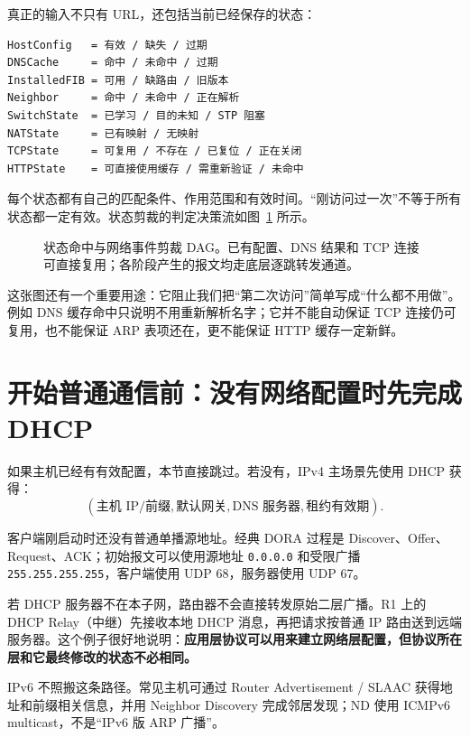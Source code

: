 \documentclass[UTF8,fontset=none,11pt,a4paper]{ctexart}
\begin{document}
真正的输入不只有 URL，还包括当前已经保存的状态：

\begin{verbatim}
HostConfig   = 有效 / 缺失 / 过期
DNSCache     = 命中 / 未命中 / 过期
InstalledFIB = 可用 / 缺路由 / 旧版本
Neighbor     = 命中 / 未命中 / 正在解析
SwitchState  = 已学习 / 目的未知 / STP 阻塞
NATState     = 已有映射 / 无映射
TCPState     = 可复用 / 不存在 / 已复位 / 正在关闭
HTTPState    = 可直接使用缓存 / 需重新验证 / 未命中
\end{verbatim}

每个状态都有自己的匹配条件、作用范围和有效时间。“刚访问过一次”不等于所有状态都一定有效。状态剪裁的判定决策流如图~\ref{fig:state-reuse} 所示。

\begin{figure}[!htbp]
  \centering
  \resizebox{0.84\linewidth}{!}{}
  \caption{状态命中与网络事件剪裁 DAG。已有配置、DNS 结果和 TCP 连接可直接复用；各阶段产生的报文均走底层逐跳转发通道。}
  \label{fig:state-reuse}
\end{figure}

这张图还有一个重要用途：它阻止我们把“第二次访问”简单写成“什么都不用做”。例如 DNS 缓存命中只说明不用重新解析名字；它并不能自动保证 TCP 连接仍可复用，也不能保证 ARP 表项还在，更不能保证 HTTP 缓存一定新鲜。

\section{开始普通通信前：没有网络配置时先完成 DHCP}

如果主机已经有有效配置，本节直接跳过。若没有，IPv4 主场景先使用 DHCP 获得：
\[
(\text{主机 IP/前缀},\text{默认网关},\text{DNS 服务器},\text{租约有效期}).
\]

客户端刚启动时还没有普通单播源地址。经典 DORA 过程是 Discover、Offer、Request、ACK；初始报文可以使用源地址 \texttt{0.0.0.0} 和受限广播 \texttt{255.255.255.255}，客户端使用 UDP 68，服务器使用 UDP 67。

若 DHCP 服务器不在本子网，路由器不会直接转发原始二层广播。R1 上的 DHCP Relay（中继）先接收本地 DHCP 消息，再把请求按普通 IP 路由送到远端服务器。这个例子很好地说明：\textbf{应用层协议可以用来建立网络层配置，但协议所在层和它最终修改的状态不必相同。}

IPv6 不照搬这条路径。常见主机可通过 Router Advertisement / SLAAC 获得地址和前缀相关信息，并用 Neighbor Discovery 完成邻居发现；ND 使用 ICMPv6 multicast，不是“IPv6 版 ARP 广播”。
\end{document}
